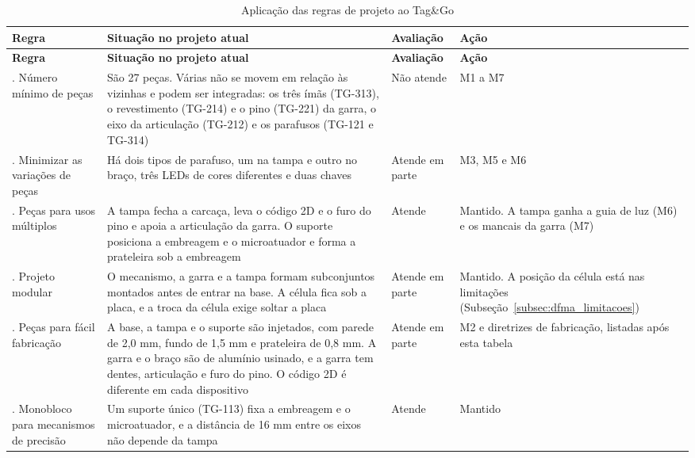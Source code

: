 \begingroup
\footnotesize
\renewcommand{\arraystretch}{1.3}
\begin{longtable}{@{}
    >{\RaggedRight\arraybackslash}p{2.7cm}
    >{\RaggedRight\arraybackslash}p{6.2cm}
    >{\RaggedRight\arraybackslash}p{1.7cm}
    >{\RaggedRight\arraybackslash}p{4.1cm}@{}}
    \caption{Aplicação das regras de projeto ao Tag\&Go}\label{tab:dfma_regras}\\
    \toprule
    \textbf{Regra} & \textbf{Situação no projeto atual} & \textbf{Avaliação} & \textbf{Ação} \\
    \midrule
    \endfirsthead
    \toprule
    \textbf{Regra} & \textbf{Situação no projeto atual} & \textbf{Avaliação} & \textbf{Ação} \\
    \midrule
    \endhead
    \bottomrule
    \endfoot
    1. Número mínimo de peças & São 27 peças. Várias não se movem em relação às vizinhas e podem ser integradas: os três ímãs (TG-313), o revestimento (TG-214) e o pino (TG-221) da garra, o eixo da articulação (TG-212) e os parafusos (TG-121 e TG-314) & Não atende & M1 a M7 \\
    2. Minimizar as variações de peças & Há dois tipos de parafuso, um na tampa e outro no braço, três LEDs de cores diferentes e duas chaves & Atende em parte & M3, M5 e M6 \\
    3. Peças para usos múltiplos & A tampa fecha a carcaça, leva o código 2D e o furo do pino e apoia a articulação da garra. O suporte posiciona a embreagem e o microatuador e forma a prateleira sob a embreagem & Atende & Mantido. A tampa ganha a guia de luz (M6) e os mancais da garra (M7) \\
    4. Projeto modular & O mecanismo, a garra e a tampa formam subconjuntos montados antes de entrar na base. A célula fica sob a placa, e a troca da célula exige soltar a placa & Atende em parte & Mantido. A posição da célula está nas limitações (Subseção~\ref{subsec:dfma_limitacoes}) \\
    5. Peças para fácil fabricação & A base, a tampa e o suporte são injetados, com parede de 2,0 mm, fundo de 1,5 mm e prateleira de 0,8 mm. A garra e o braço são de alumínio usinado, e a garra tem dentes, articulação e furo do pino. O código 2D é diferente em cada dispositivo & Atende em parte & M2 e diretrizes de fabricação, listadas após esta tabela \\
    6. Monobloco para mecanismos de precisão & Um suporte único (TG-113) fixa a embreagem e o microatuador, e a distância de 16 mm entre os eixos não depende da tampa & Atende & Mantido \\

\end{longtable}
